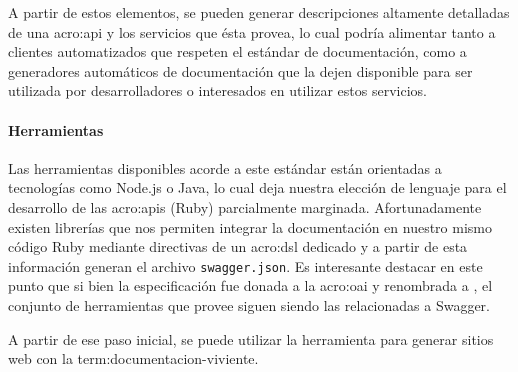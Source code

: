 A partir de estos elementos, se pueden generar descripciones altamente detalladas de una \gls{acro:api} y los servicios que ésta provea, lo cual podría alimentar tanto a clientes automatizados que respeten el estándar de documentación, como a generadores automáticos de documentación que la dejen disponible para ser utilizada por desarrolladores o interesados en utilizar estos servicios.

\paragraph{Herramientas}

Las herramientas disponibles acorde a este estándar están orientadas a tecnologías como Node.js o Java, lo cual deja nuestra elección de lenguaje para el desarrollo de las \glspl{acro:api} (Ruby) parcialmente marginada. Afortunadamente existen librerías que nos permiten integrar la documentación en nuestro mismo código Ruby mediante directivas de un \gls{acro:dsl} dedicado y a partir de esta información generan el archivo \texttt{swagger.json}. Es interesante destacar en este punto que si bien la especificación fue donada a la \gls{acro:oai} y renombrada a \oaispec, el conjunto de herramientas que provee siguen siendo las relacionadas a Swagger.

A partir de ese paso inicial, se puede utilizar la herramienta  para generar sitios web con la \gls{term:documentacion-viviente}.
